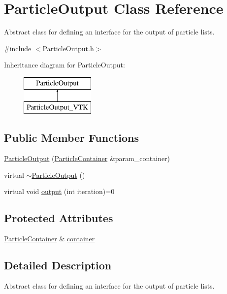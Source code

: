 \hypertarget{classParticleOutput}{\section{Particle\-Output Class Reference}
\label{classParticleOutput}
}


Abstract class for defining an interface for the output of particle lists.  




{\ttfamily \#include $<$Particle\-Output.\-h$>$}

Inheritance diagram for Particle\-Output\-:\begin{figure}[H]
\begin{center}
\leavevmode
\includegraphics[height=2.000000cm]{classParticleOutput}
\end{center}
\end{figure}
\subsection*{Public Member Functions}
\begin{DoxyCompactItemize}
\item 
\hyperlink{classParticleOutput_aeff31b979282204fe1e33c20b8e57ec9}{Particle\-Output} (\hyperlink{classParticleContainer}{Particle\-Container} \&param\-\_\-container)
\item 
virtual \hyperlink{classParticleOutput_a8d16ca46401753c8a10bcd593165bcd8}{$\sim$\-Particle\-Output} ()
\item 
virtual void \hyperlink{classParticleOutput_afb77d9748a4a7c9e0d1ca110d04b653b}{output} (int iteration)=0
\end{DoxyCompactItemize}
\subsection*{Protected Attributes}
\begin{DoxyCompactItemize}
\item 
\hyperlink{classParticleContainer}{Particle\-Container} \& \hyperlink{classParticleOutput_a07b2fe0d460ee8935ce5852ddd4adbd3}{container}
\end{DoxyCompactItemize}


\subsection{Detailed Description}
Abstract class for defining an interface for the output of particle lists. 

